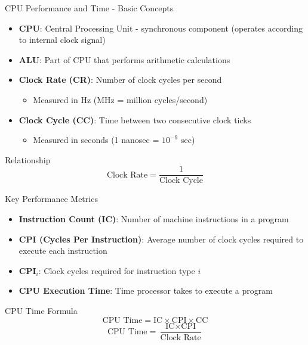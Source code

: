 \documentclass[aspectratio=169,12pt]{beamer}
\begin{document}
\begin{frame}{CPU Performance and Time - Basic Concepts}
\begin{itemize}
    \item \textbf{CPU}: Central Processing Unit - synchronous component (operates according to internal clock signal)
    \item \textbf{ALU}: Part of CPU that performs arithmetic calculations
    \item \textbf{Clock Rate (CR)}: Number of clock cycles per second
    \begin{itemize}
        \item Measured in Hz (MHz = million cycles/second)
    \end{itemize}
    \item \textbf{Clock Cycle (CC)}: Time between two consecutive clock ticks
    \begin{itemize}
        \item Measured in seconds (1 nanosec = $10^{-9}$ sec)
    \end{itemize}
\end{itemize}

\begin{block}{Relationship}
$$\text{Clock Rate} = \frac{1}{\text{Clock Cycle}}$$
\end{block}
\end{frame}

\begin{frame}{Key Performance Metrics}
\begin{itemize}
    \item \textbf{Instruction Count (IC)}: Number of machine instructions in a program
    \item \textbf{CPI (Cycles Per Instruction)}: Average number of clock cycles required to execute each instruction
    \item \textbf{CPI$_i$}: Clock cycles required for instruction type $i$
    \item \textbf{CPU Execution Time}: Time processor takes to execute a program
\end{itemize}

\begin{block}{CPU Time Formula}
$$\text{CPU Time} = \text{IC} \times \text{CPI} \times \text{CC}$$
$$\text{CPU Time} = \frac{\text{IC} \times \text{CPI}}{\text{Clock Rate}}$$
\end{block}
\end{frame}
\end{document}
